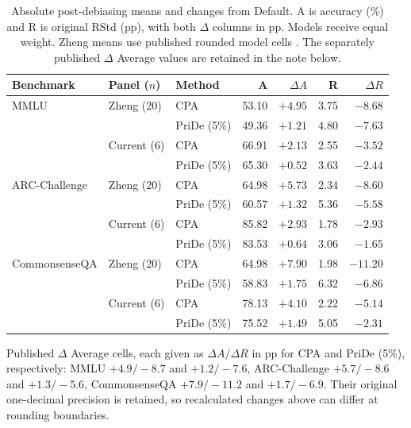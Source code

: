 \begin{table}[htbp]
\centering\small\setlength{\tabcolsep}{4pt}
\caption{Absolute post-debiasing means and changes from Default. A is accuracy (\%) and R is original RStd (pp), with both $\Delta$ columns in pp. Models receive equal weight. Zheng means use published rounded model cells \citep[Table~3, p.~22]{zheng2024robust}. The separately published $\Delta$ Average values are retained in the note below.}
\label{tab:rq1-zheng-comparison}
\begin{tabular}{lllrrrr}
\toprule
Benchmark & Panel ($n$) & Method & A & $\Delta A$ & R & $\Delta R$\\
\midrule
MMLU & Zheng (20) & CPA & 53.10 & $+4.95$ & 3.75 & $-8.68$\\
 &  & PriDe (5\%) & 49.36 & $+1.21$ & 4.80 & $-7.63$\\
 & Current (6) & CPA & 66.91 & $+2.13$ & 2.55 & $-3.52$\\
 &  & PriDe (5\%) & 65.30 & $+0.52$ & 3.63 & $-2.44$\\
\addlinespace[4pt]
ARC-Challenge & Zheng (20) & CPA & 64.98 & $+5.73$ & 2.34 & $-8.60$\\
 &  & PriDe (5\%) & 60.57 & $+1.32$ & 5.36 & $-5.58$\\
 & Current (6) & CPA & 85.82 & $+2.93$ & 1.78 & $-2.93$\\
 &  & PriDe (5\%) & 83.53 & $+0.64$ & 3.06 & $-1.65$\\
\addlinespace[4pt]
CommonsenseQA & Zheng (20) & CPA & 64.98 & $+7.90$ & 1.98 & $-11.20$\\
 &  & PriDe (5\%) & 58.83 & $+1.75$ & 6.32 & $-6.86$\\
 & Current (6) & CPA & 78.13 & $+4.10$ & 2.22 & $-5.14$\\
 &  & PriDe (5\%) & 75.52 & $+1.49$ & 5.05 & $-2.31$\\
\bottomrule
\end{tabular}
\par\vspace{3pt}\begin{minipage}{.98\linewidth}\footnotesize
Published $\Delta$ Average cells, each given as $\Delta A/\Delta R$ in pp for CPA and PriDe (5\%), respectively: MMLU $+4.9/-8.7$ and $+1.2/-7.6$, ARC-Challenge $+5.7/-8.6$ and $+1.3/-5.6$, CommonsenseQA $+7.9/-11.2$ and $+1.7/-6.9$. Their original one-decimal precision is retained, so recalculated changes above can differ at rounding boundaries.
\end{minipage}
\end{table}
